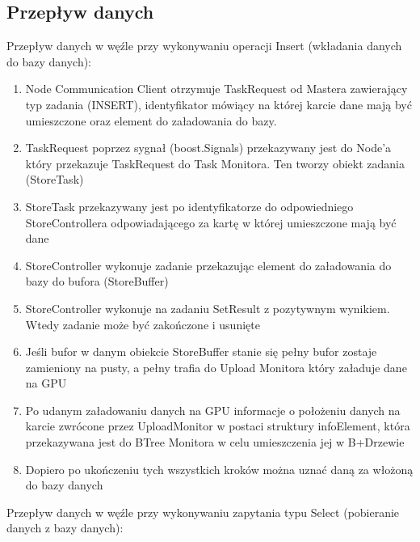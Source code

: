 \documentclass[paper=a4, fontsize=11pt]{scrartcl} %
\numberwithin{equation}{section} %
\numberwithin{figure}{section} %
\numberwithin{table}{section} %
\begin{document}
	\subsection{Przepływ danych}
		Przepływ danych w węźle przy wykonywaniu operacji Insert (wkładania danych do bazy danych):
		\begin{enumerate}
			\item Node Communication Client otrzymuje TaskRequest od Mastera zawierający typ zadania (INSERT), identyfikator mówiący 
				na której karcie dane mają być umieszczone oraz element do załadowania do bazy.
			\item TaskRequest poprzez sygnał (boost.Signals) przekazywany jest do Node'a który przekazuje TaskRequest do Task Monitora. Ten tworzy 
				obiekt zadania (StoreTask)
			\item StoreTask przekazywany jest po identyfikatorze do odpowiedniego StoreControllera odpowiadającego za kartę w której umieszczone mają być dane
			\item StoreController wykonuje zadanie przekazując element do załadowania do bazy do bufora (StoreBuffer)
			\item StoreController wykonuje na zadaniu SetResult z pozytywnym wynikiem. Wtedy zadanie może być zakończone i usunięte
			\item Jeśli bufor w danym obiekcie StoreBuffer stanie się pełny bufor zostaje zamieniony na pusty, a pełny trafia do Upload Monitora który załaduje dane na GPU
			\item Po udanym załadowaniu danych na GPU informacje o położeniu danych na karcie zwrócone przez UploadMonitor w postaci struktury infoElement, która przekazywana jest do
				BTree Monitora w celu umieszczenia jej w B+Drzewie 
			\item Dopiero po ukończeniu tych wszystkich kroków można uznać daną za włożoną do bazy danych
		\end{enumerate}
		Przepływ danych w węźle przy wykonywaniu zapytania typu Select (pobieranie danych z bazy danych):
\end{document}
